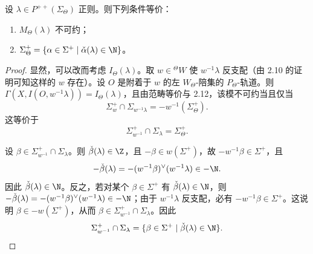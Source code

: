 \begin{theorem}\label{thm:06.2.13}
设 $\lambda\in P^{++}(\Sigma_\Theta)$ 正则。则下列条件等价：
\begin{enumerate}[label=(\roman*)]
\item $M_\Theta(\lambda)$ 不可约；
\item $\Sigma^+_\Theta=\{\alpha\in\Sigma^+\mid \check\alpha(\lambda)\in\N\}$。
\end{enumerate}
\end{theorem}

\begin{proof}
显然，可以改而考虑 $I_\Theta(\lambda)$。取 $w\in{}^{\Theta}W$ 使 $w^{-1}\lambda$ 反支配（由 2.10 的证明可知这样的 $w$ 存在）。设 $O$ 是附着于 $w$ 的左 $W_\Theta$-陪集的 $P_\Theta$-轨道。则 $\Gamma(X,I(O,w^{-1}\lambda))=I_\Theta(\lambda)$，且由范畴等价与 2.12，该模不可约当且仅当
$$\Sigma^+_w\cap\Sigma_{w^{-1}\lambda}=-w^{-1}(\Sigma^+_\Theta).$$
这等价于
$$\Sigma^+_{w^{-1}}\cap\Sigma_\lambda=\Sigma^+_\Theta.$$

设 $\beta\in\Sigma^+_{w^{-1}}\cap\Sigma_\lambda$。则 $\check\beta(\lambda)\in\Z$，且 $-\beta\in w(\Sigma^+)$，故 $-w^{-1}\beta\in\Sigma^+$，且
$$-\check\beta(\lambda)=-(w^{-1}\beta)^{\vee}(w^{-1}\lambda)\in-\N.$$
因此 $\check\beta(\lambda)\in\N$。反之，若对某个 $\beta\in\Sigma^+$ 有 $\check\beta(\lambda)\in\N$，则 $-\check\beta(\lambda)=-(w^{-1}\beta)^{\vee}(w^{-1}\lambda)\in-\N$；由于 $w^{-1}\lambda$ 反支配，必有 $-w^{-1}\beta\in\Sigma^+$。这说明 $\beta\in-w(\Sigma^+)$，从而 $\beta\in\Sigma^+_{w^{-1}}\cap\Sigma_\lambda$。因此
$$\Sigma^+_{w^{-1}}\cap\Sigma_\lambda=\{\beta\in\Sigma^+\mid \check\beta(\lambda)\in\N\}.$$
\end{proof}
